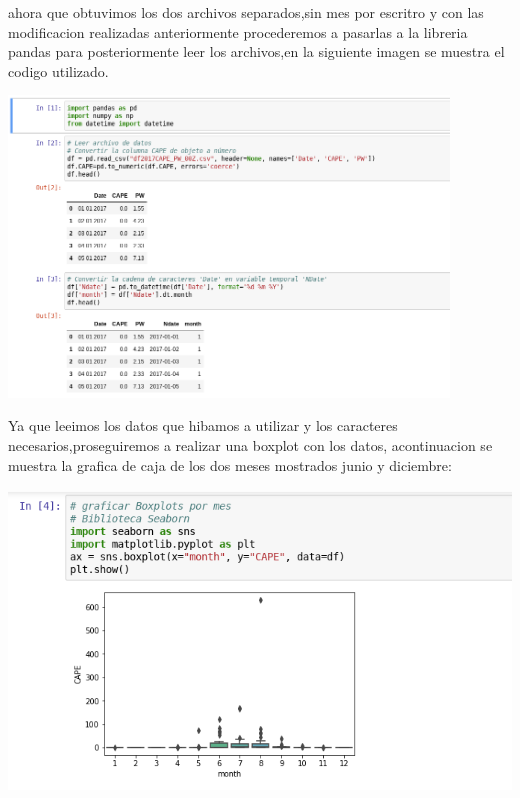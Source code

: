 \documentclass{article}
\begin{document}
\begin{itemize}
\vspace{1mm}

ahora que obtuvimos los dos archivos separados,sin mes por escritro y con las modificacion realizadas anteriormente procederemos a pasarlas a la libreria pandas para posteriormente leer los archivos,en la siguiente imagen se muestra el codigo utilizado.

\begin{center}
\includegraphics[height=8cm]{jupyter.png}
\end{center}

Ya que leeimos los datos que hibamos a utilizar y los caracteres necesarios,proseguiremos a realizar una boxplot con los datos, acontinuacion se muestra la grafica de caja de los dos meses mostrados junio y diciembre:

\begin{center}
\includegraphics[height=8cm]{jupyter1.png}
\end{center}


\end{itemize}
\end{document}
